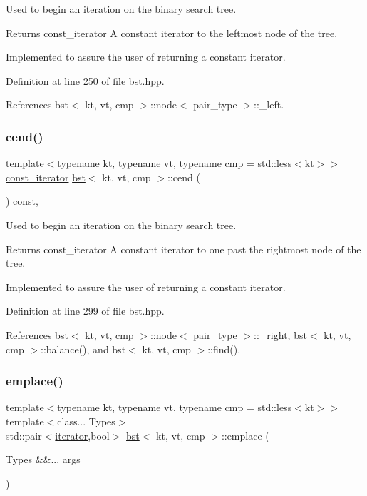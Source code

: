 Used to begin an iteration on the binary search tree. 

\begin{DoxyReturn}{Returns}
const\+\_\+iterator A constant iterator to the leftmost node of the tree.
\end{DoxyReturn}
Implemented to assure the user of returning a constant iterator. 

Definition at line 250 of file bst.\+hpp.



References bst$<$ kt, vt, cmp $>$\+::node$<$ pair\+\_\+type $>$\+::\+\_\+left.

\mbox{\label{classbst_a2f78931b69f0a121823b60393f1b9745}} 
\subsubsection{\texorpdfstring{cend()}{cend()}}
{\footnotesize\ttfamily template$<$typename kt, typename vt, typename cmp = std\+::less$<$kt$>$$>$ \\
\hyperlink{classbst_a72485696d999bf489c6156f6327a2163}{const\+\_\+iterator} \hyperlink{classbst}{bst}$<$ kt, vt, cmp $>$\+::cend (\begin{DoxyParamCaption}{ }\end{DoxyParamCaption}) const\hspace{0.3cm}{\ttfamily [inline]}, {\ttfamily [noexcept]}}



Used to begin an iteration on the binary search tree. 

\begin{DoxyReturn}{Returns}
const\+\_\+iterator A constant iterator to one past the rightmost node of the tree.
\end{DoxyReturn}
Implemented to assure the user of returning a constant iterator. 

Definition at line 299 of file bst.\+hpp.



References bst$<$ kt, vt, cmp $>$\+::node$<$ pair\+\_\+type $>$\+::\+\_\+right, bst$<$ kt, vt, cmp $>$\+::balance(), and bst$<$ kt, vt, cmp $>$\+::find().

\mbox{\label{classbst_a03e09650b371d423315f26520d6e34a6}} 
\subsubsection{\texorpdfstring{emplace()}{emplace()}}
{\footnotesize\ttfamily template$<$typename kt, typename vt, typename cmp = std\+::less$<$kt$>$$>$ \\
template$<$class... Types$>$ \\
std\+::pair$<$\hyperlink{classbst_a429b0445783ff6486882db5dee900ce0}{iterator},bool$>$ \hyperlink{classbst}{bst}$<$ kt, vt, cmp $>$\+::emplace (\begin{DoxyParamCaption}\item[{Types \&\&...}]{args }\end{DoxyParamCaption})}



